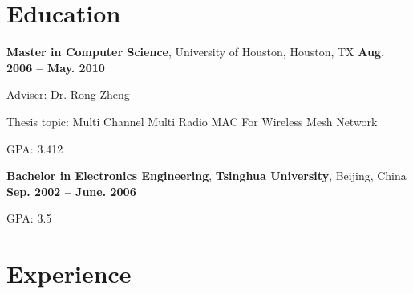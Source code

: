 \documentclass[overlapped, line]{resume}
\begin{document}
\address{mobile: 832 964 6883; e-mail: 1983.song.wei@gmail.com}
\begin{resume}



  \vspace{-10pt}\section{Education}
         {\bf Master in Computer Science}, University of Houston, Houston, TX \hfill {\bf Aug. 2006 -- May. 2010}\\
         \vspace{-10pt}      %
         \begin{list2}
         \item Adviser:  Dr. Rong Zheng
         \item Thesis topic:  Multi Channel Multi Radio MAC For Wireless Mesh Network
         \item GPA: 3.412
         \end{list2}  \vspace{-5pt}

         {\bf Bachelor in Electronics Engineering}, \textbf{Tsinghua University}, Beijing, China \hfill {\bf Sep. 2002 -- June. 2006}\\
         \vspace{-10pt}      %
         \begin{list2}
         \item GPA: 3.5
         \end{list2}  \vspace{-5pt}
         \vspace{-15pt}\section{Experience}


\end{resume}
\end{document}
